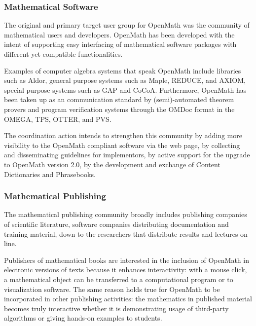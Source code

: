 \documentclass{euproposal}
\begin{document}
\subsubsection{Mathematical Software}\label{sec:msw}

The original and primary target user group for OpenMath was the
community of mathematical users and developers. OpenMath has been
developed with the intent of supporting easy interfacing of
mathematical software packages with different yet compatible
functionalities.

Examples of computer algebra systems that speak OpenMath include
libraries such as Aldor, general purpose systems such as Maple,
REDUCE, and AXIOM, special purpose systems such as GAP and CoCoA.
Furthermore, OpenMath has been taken up as an communication standard
by (semi)-automated theorem provers and program verification systems
through the OMDoc format in the OMEGA, TPS, OTTER, and PVS.

The coordination action intends to strengthen this community by adding
more visibility to the OpenMath compliant software via the web page,
by collecting and disseminating guidelines for implementors, by active
support for the upgrade to OpenMath version 2.0, by the development
and exchange of Content Dictionaries and Phrasebooks.

\subsubsection{Mathematical Publishing}\label{sec:mpubl}

The mathematical publishing community broadly includes publishing
companies of scientific literature, software companies distributing
documentation and training material, down to the researchers that
distribute results and lectures on-line.

Publishers of mathematical books are interested in the inclusion of
OpenMath in electronic versions of texts because it enhances
interactivity: with a mouse click, a mathematical object can be
transferred to a computational program or to visualization software.
The same reason holds true for OpenMath to be incorporated in other
publishing activities: the mathematics in published material becomes
truly interactive whether it is demonstrating usage of third-party
algorithms or giving hands-on examples to students.
\end{document}
